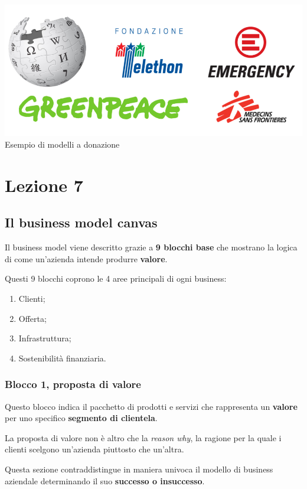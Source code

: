 \documentclass[14pt]{extarticle}
\begin{document}
\begin{center}
    \includegraphics[scale=0.60]{images/donazioni.png}
    Esempio di modelli a donazione
\end{center}

\section{Lezione 7}

\subsection{Il business model canvas}

Il business model viene descritto grazie a \textbf{9 blocchi base} che mostrano
la logica di come un'azienda intende produrre \textbf{valore}.

Questi 9 blocchi coprono le 4 aree principali di ogni business:

\begin{enumerate}
    \item Clienti;
    \item Offerta;
    \item Infrastruttura;
    \item Sostenibilità finanziaria.
\end{enumerate}

\subsubsection{Blocco 1, proposta di valore}

Questo blocco indica il pacchetto di prodotti e servizi che rappresenta un
\textbf{valore} per uno specifico \textbf{segmento di clientela}.

La proposta di valore non è altro che la \textit{reason why}, la ragione per la
quale i clienti scelgono un'azienda piuttosto che un'altra.

Questa sezione contraddistingue in maniera univoca il modello di business
aziendale determinando il suo \textbf{successo o insuccesso}.
\end{document}
